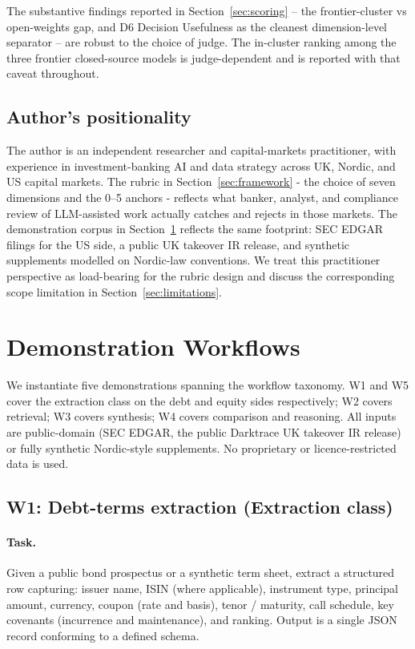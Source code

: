\documentclass[11pt]{article}
\begin{document}
The substantive findings reported in Section~\ref{sec:scoring} -- the frontier-cluster vs open-weights gap, and D6 Decision Usefulness as the cleanest dimension-level separator -- are robust to the choice of judge. The in-cluster ranking among the three frontier closed-source models is judge-dependent and is reported with that caveat throughout.

\subsection{Author's positionality}

The author is an independent researcher and capital-markets practitioner, with experience in investment-banking AI and data strategy across UK, Nordic, and US capital markets. The rubric in Section~\ref{sec:framework} - the choice of seven dimensions and the 0--5 anchors - reflects what banker, analyst, and compliance review of LLM-assisted work actually catches and rejects in those markets. The demonstration corpus in Section~\ref{sec:demos} reflects the same footprint: SEC EDGAR filings for the US side, a public UK takeover IR release, and synthetic supplements modelled on Nordic-law conventions. We treat this practitioner perspective as load-bearing for the rubric design and discuss the corresponding scope limitation in Section~\ref{sec:limitations}.

\section{Demonstration Workflows}
\label{sec:demos}

We instantiate five demonstrations spanning the workflow taxonomy. W1 and W5 cover the extraction class on the debt and equity sides respectively; W2 covers retrieval; W3 covers synthesis; W4 covers comparison and reasoning. All inputs are public-domain (SEC EDGAR, the public Darktrace UK takeover IR release) or fully synthetic Nordic-style supplements. No proprietary or licence-restricted data is used.

\subsection{W1: Debt-terms extraction (Extraction class)}

\paragraph{Task.} Given a public bond prospectus or a synthetic term sheet, extract a structured row capturing: issuer name, ISIN (where applicable), instrument type, principal amount, currency, coupon (rate and basis), tenor / maturity, call schedule, key covenants (incurrence and maintenance), and ranking. Output is a single JSON record conforming to a defined schema.
\end{document}
